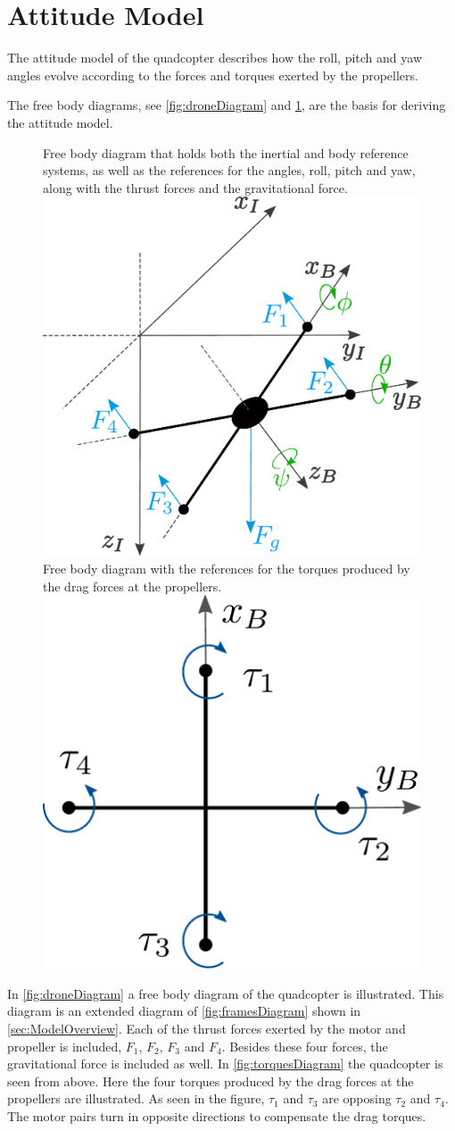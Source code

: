 \section{Attitude Model} \label{sec:AttitudeModel}
The attitude model of the quadcopter describes how the roll, pitch and yaw angles evolve according to the forces and torques exerted by the propellers. 

The free body diagrams, see \autoref{fig:droneDiagram} and \ref{fig:torquesDiagram}, are the basis for deriving the attitude model.
%
\begin{figure}[H]
  \captionbox
  {
    Free body diagram that holds both the inertial and body reference systems, as well as the references for the angles, roll, pitch and yaw, along with the thrust forces and the gravitational force.
    \label{fig:droneDiagram}
  }
  {
    \includegraphics[width=.48\textwidth]{figures/droneDiagram}
  }
  \hspace{5pt}
  \captionbox
  {
    Free body diagram with the references for the torques produced by the drag forces at the propellers.
    \label{fig:torquesDiagram}
  }
  {
    \includegraphics[width=.42\textwidth]{figures/torquesDiagram}
    \vspace{.5cm}
  }
\end{figure}
%
In \autoref{fig:droneDiagram} a free body diagram of the quadcopter is illustrated. This diagram is an extended diagram of \autoref{fig:framesDiagram} shown in \autoref{sec:ModelOverview}. Each of the thrust forces exerted by the motor and propeller is included, $F_1$, $F_2$, $F_3$ and $F_4$. Besides these four forces, the gravitational force is included as well. In \autoref{fig:torquesDiagram} the quadcopter is seen from above. Here the four torques produced by the drag forces at the propellers are illustrated. As seen in the figure, $\tau_1$ and $\tau_3$ are opposing $\tau_2$ and $\tau_4$. The motor pairs turn in opposite directions to compensate the drag torques.

